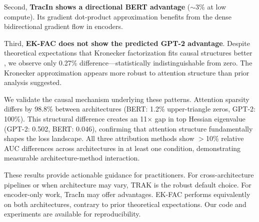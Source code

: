 Second, \textbf{TracIn shows a directional BERT advantage} ($\sim$3\% at low compute). Its gradient dot-product approximation benefits from the dense bidirectional gradient flow in encoders.

Third, \textbf{EK-FAC does not show the predicted GPT-2 advantage}. Despite theoretical expectations that Kronecker factorization fits causal structures better \citep{grosse2023studying}, we observe only 0.27\% difference---statistically indistinguishable from zero. The Kronecker approximation appears more robust to attention structure than prior analysis suggested.

We validate the causal mechanism underlying these patterns. Attention sparsity differs by 98.8\% between architectures (BERT: 1.2\% upper-triangle zeros, GPT-2: 100\%). This structural difference creates an 11$\times$ gap in top Hessian eigenvalue (GPT-2: 0.502, BERT: 0.046), confirming that attention structure fundamentally shapes the loss landscape. All three attribution methods show $>$10\% relative AUC differences across architectures in at least one condition, demonstrating measurable architecture-method interaction.

These results provide actionable guidance for practitioners. For cross-architecture pipelines or when architecture may vary, TRAK is the robust default choice. For encoder-only work, TracIn may offer advantages. EK-FAC performs equivalently on both architectures, contrary to prior theoretical expectations. Our code and experiments are available for reproducibility.

